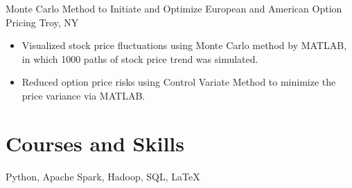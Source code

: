 \documentclass[11pt,a4paper,roman]{moderncv} %
\begin{document}
{Monte Carlo Method to Initiate and Optimize European and American Option Pricing}
{Troy, NY}{}
{\begin{itemize}  %
    \item Visualized stock price fluctuations using Monte Carlo method by MATLAB, in which 1000 paths of stock price trend was simulated. %
    \item Reduced option price risks using Control Variate Method to minimize the price variance via MATLAB. %
\end{itemize}}
                

\section{Courses and Skills}
{\small
{Python, Apache Spark, Hadoop, SQL, LaTeX}}
%
%
%
%
%
%
%
\end{document}
